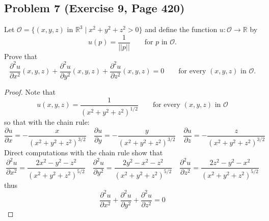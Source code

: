 \documentclass{article}
\begin{document}
\subsection*{Problem 7 (Exercise 9, Page 420)}
Let $\mathcal{O} = \{(x, y, z) \text{ in } \mathbb{R}^3 \mid x^2 + y^2 + z^2 > 0\}$ and define the function $u \colon \mathcal{O} \to \mathbb{R}$ by   
\[ u(p) = \frac{1}{||p||} \qquad \text{for $p$ in $\mathcal{O}$}.\]
Prove that
\[ \frac{\partial^2 u}{\partial x^2}(x, y, z) + \frac{\partial^2 u}{\partial y^2}(x, y, z) + \frac{\partial^2 u}{\partial z^2}(x, y, z) = 0 \qquad \text{for every $(x, y, z)$ in $\mathcal{O}$}.\]
\begin{proof}
Note that 
\[ u(x, y, z) = \frac{1}{(x^2 + y^2 + z^2)^{1/2}} \qquad \text{for every $(x, y, z)$ in $\mathcal{O}$}\]
so that with the chain rule:
\[\frac{\partial u}{\partial x} = -\frac{x}{(x^2 + y^2 + z^2)^{3/2}} \quad \frac{\partial u}{\partial y} = -\frac{y}{(x^2 + y^2 + z^2)^{3/2}} \quad \frac{\partial u}{\partial z} = -\frac{z}{(x^2 + y^2 + z^2)^{3/2}}\]
Direct computations with the chain rule show that
\[ \frac{\partial^2 u}{\partial x^2} = \frac{2x^2-y^2-z^2}{(x^2+y^2+z^2)^{5/2}} \quad \frac{\partial^2 u}{\partial y^2} = \frac{2y^2-x^2-z^2}{(x^2+y^2+z^2)^{5/2}} \quad \frac{\partial^2 u}{\partial z^2} = \frac{2z^2-y^2-x^2}{(x^2+y^2+z^2)^{5/2}}\]
thus
\[ \frac{\partial^2 u}{\partial x^2} + \frac{\partial^2 u}{\partial y^2} + \frac{\partial^2 u}{\partial z^2} = 0\]
\end{proof}
\end{document}
